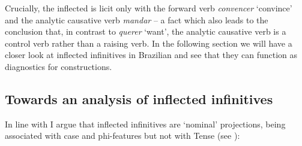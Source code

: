 \documentclass[output=paper]{langsci/langscibook}
\begin{document}
Crucially, the inflected  is licit only with the forward  verb \textit{convencer} ‘convince’ and the analytic causative verb \textit{mandar} – a fact which also leads to the conclusion that, in contrast to \textit{querer} ‘want’, the analytic causative verb is a control verb rather than a raising verb. In the following section we will have a closer look at inflected infinitives in Brazilian  and see that they can function as diagnostics for  constructions.

\subsection{Towards an analysis of inflected infinitives}%

In line with \citet{Raposo1987} I argue that inflected infinitives are ‘nominal’ projections, being associated with case and phi-features but not with Tense (see \citealt{Stowell1982}):

\ea%
    \label{ex:moreno:27}
    \z
\z
\end{document}
